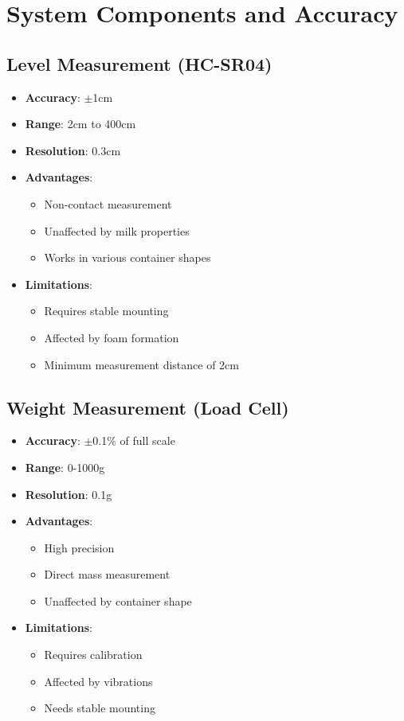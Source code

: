 \documentclass[12pt,a4paper]{article}
\begin{document}
\section{System Components and Accuracy}

\subsection{Level Measurement (HC-SR04)}
\begin{itemize}
    \item \textbf{Accuracy}: $\pm$1cm
    \item \textbf{Range}: 2cm to 400cm
    \item \textbf{Resolution}: 0.3cm
    \item \textbf{Advantages}:
    \begin{itemize}
        \item Non-contact measurement
        \item Unaffected by milk properties
        \item Works in various container shapes
    \end{itemize}
    \item \textbf{Limitations}:
    \begin{itemize}
        \item Requires stable mounting
        \item Affected by foam formation
        \item Minimum measurement distance of 2cm
    \end{itemize}
\end{itemize}

\subsection{Weight Measurement (Load Cell)}
\begin{itemize}
    \item \textbf{Accuracy}: $\pm$0.1\% of full scale
    \item \textbf{Range}: 0-1000g
    \item \textbf{Resolution}: 0.1g
    \item \textbf{Advantages}:
    \begin{itemize}
        \item High precision
        \item Direct mass measurement
        \item Unaffected by container shape
    \end{itemize}
    \item \textbf{Limitations}:
    \begin{itemize}
        \item Requires calibration
        \item Affected by vibrations
        \item Needs stable mounting
    \end{itemize}
\end{itemize}
\end{document}
